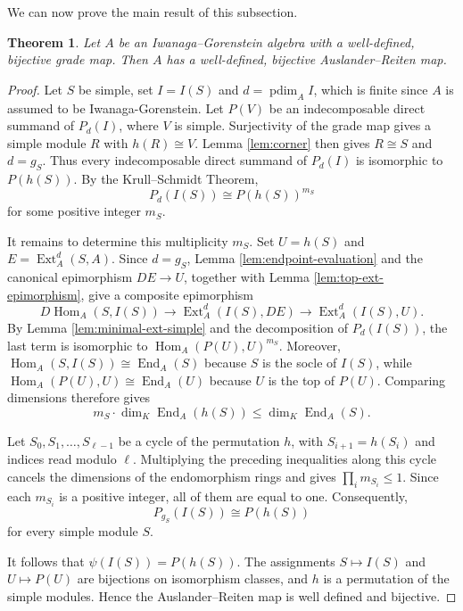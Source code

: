 \documentclass[a4paper]{amsart}
\newtheorem{theorem}{Theorem}[section]
\theoremstyle{definition}
\theoremstyle{remark}
\numberwithin{equation}{section}
\newcommand{\Ext}{\operatorname{Ext}}
\newcommand{\End}{\operatorname{End}}
\newcommand{\pdim}{\operatorname{pdim}}
\newcommand{\Hom}{\operatorname{Hom}}
\begin{document}
We can now prove the main result of this subsection.
\begin{theorem}
Let $A$ be an Iwanaga--Gorenstein algebra with a well-defined, bijective grade map. Then $A$ has a well-defined, bijective Auslander--Reiten map.
\end{theorem}

\begin{proof}
Let $S$ be simple, set $I=I(S)$ and $d=\pdim_A I$, which is finite since $A$ is assumed to be Iwanaga-Gorenstein. Let $P(V)$ be an indecomposable direct summand of $P_d(I)$, where $V$ is simple. Surjectivity of the grade map gives a simple module $R$ with $h(R)\cong V$. Lemma \ref{lem:corner} then gives $R\cong S$ and $d=g_S$. Thus every indecomposable direct summand of $P_d(I)$ is isomorphic to $P(h(S))$. By the Krull--Schmidt Theorem,
\[
 P_d(I(S))\cong P(h(S))^{m_S}
\]
for some positive integer $m_S$.

It remains to determine this multiplicity $m_S$. Set $U=h(S)$ and $E=\Ext_A^d(S,A)$. Since $d=g_S$, Lemma \ref{lem:endpoint-evaluation} and the canonical epimorphism $DE\to U$, together with Lemma \ref{lem:top-ext-epimorphism}, give a composite epimorphism
\[
 D\Hom_A(S,I(S))\longrightarrow\Ext_A^d(I(S),DE)
 \longrightarrow\Ext_A^d(I(S),U).
\]
By Lemma \ref{lem:minimal-ext-simple} and the decomposition of $P_d(I(S))$, the last term is isomorphic to $\Hom_A(P(U),U)^{m_S}$. Moreover, $\Hom_A(S,I(S))\cong\End_A(S)$ because $S$ is the socle of $I(S)$, while $\Hom_A(P(U),U)\cong\End_A(U)$ because $U$ is the top of $P(U)$. Comparing dimensions therefore gives
\[
 m_S\cdot\dim_K\End_A(h(S))\leq\dim_K\End_A(S).
\]

Let $S_0,S_1,\ldots,S_{\ell-1}$ be a cycle of the permutation $h$, with $S_{i+1}=h(S_i)$ and indices read modulo $\ell$. Multiplying the preceding inequalities along this cycle cancels the dimensions of the endomorphism rings and gives $\prod_i m_{S_i}\leq 1$. Since each $m_{S_i}$ is a positive integer, all of them are equal to one. Consequently,
\[
 P_{g_S}(I(S))\cong P(h(S))
\]
for every simple module $S$.

It follows that $\psi(I(S))=P(h(S))$. The assignments $S\mapsto I(S)$ and $U\mapsto P(U)$ are bijections on isomorphism classes, and $h$ is a permutation of the simple modules. Hence the Auslander--Reiten map is well defined and bijective.
\end{proof}
\end{document}
